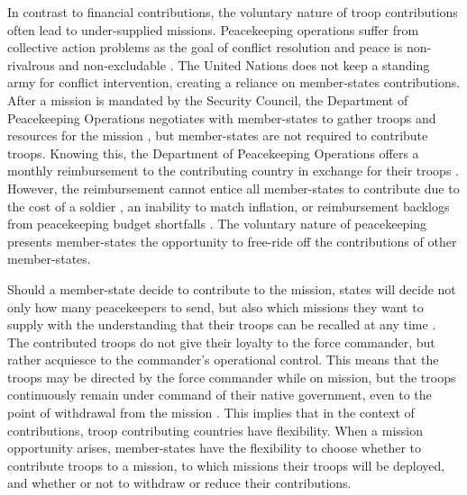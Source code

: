 \documentclass[12pt]{article}
\begin{document}

In contrast to financial contributions, the voluntary nature of troop contributions often lead to under-supplied missions. Peacekeeping operations suffer from collective action problems as the goal of conflict resolution and peace is non-rivalrous and non-excludable \citep{boncheck1997}. The United Nations does not keep a standing army for conflict intervention, creating a reliance on member-states contributions. After a mission is mandated by the Security Council, the Department of Peacekeeping Operations negotiates with member-states to gather troops and resources for the mission \citep{allen2014}, but member-states are not required to contribute troops. Knowing this, the Department of Peacekeeping Operations offers a monthly reimbursement to the contributing country in exchange for their troops \citep{united_nations}. However, the reimbursement cannot entice all member-states to contribute due to the cost of a soldier \citep{bove2011}, an inability to match inflation, or reimbursement backlogs from peacekeeping budget shortfalls \citep{coleman2018}. The voluntary nature of peacekeeping presents member-states the opportunity to free-ride off the contributions of other member-states. 

Should a member-state decide to contribute to the mission, states will decide not only how many peacekeepers to send, but also which missions they want to supply with the understanding that their troops can be recalled at any time \citep{united_nations}. The contributed troops do not give their loyalty to the force commander, but rather acquiesce to the commander's operational control. This means that the troops may be directed by the force commander while on mission, but the troops continuously remain under command of their native government, even to the point of withdrawal from the mission \citep{leck2009}. This implies that in the context of contributions, troop contributing countries have flexibility. When a mission opportunity arises, member-states have the flexibility to choose whether to contribute troops to a mission, to which missions their troops will be deployed, and whether or not to withdraw or reduce their contributions.
\end{document}
